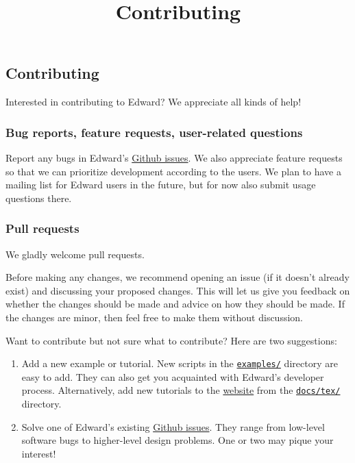 \title{Contributing}

\subsection{Contributing}

Interested in contributing to Edward? We appreciate all kinds of help!

\subsubsection{Bug reports, feature requests, user-related questions}

Report any bugs in Edward's
\href{https://github.com/blei-lab/edward/issues}
{Github issues}.
We also appreciate feature requests so that we can prioritize
development according to the users.
We plan to have a
mailing list for Edward users in the future,
but for now also submit usage questions there.

\subsubsection{Pull requests}

We gladly welcome pull requests.

Before making any changes, we recommend opening an issue (if it
doesn't already exist) and discussing your proposed changes. This will
let us give you feedback on whether the changes should be made and
advice on how they should be made.
If the changes are minor, then feel free to make them
without discussion.

Want to contribute but not sure what to contribute? Here are two
suggestions:
\begin{enumerate}
\item
Add a new example or tutorial.
New scripts in the
\href{https://github.com/blei-lab/edward/tree/master/examples}
{\texttt{examples/}} directory are easy to add. They can also
get you acquainted with Edward's developer process.
Alternatively, add new tutorials to the
\href{tutorials.html}{website} from the
\href{https://github.com/blei-lab/edward/tree/master/docs/tex}
{\texttt{docs/tex/}} directory.
\item
Solve one of Edward's existing
\href{https://github.com/blei-lab/edward/issues}{Github issues}.
They range from low-level software bugs to higher-level design problems.
One or two may pique your interest!
\end{enumerate}

